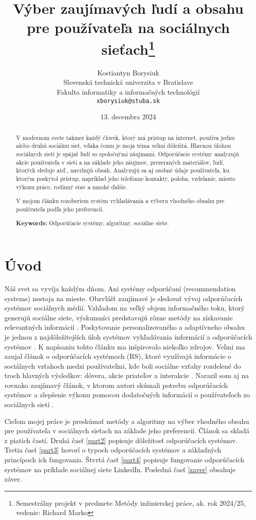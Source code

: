 \documentclass[10pt,twoside,slovak,a4paper]{article}
\title{Výber zaujímavých ľudí a obsahu pre používateľa na sociálnych sieťach\thanks{Semestrálny projekt v predmete Metódy inžinierskej práce, ak. rok 2024/25, vedenie: Richard Marko}} %
\author{Kostiantyn Borysiuk\\[2pt]
	{\small Slovenská technická univerzita v Bratislave}\\
	{\small Fakulta informatiky a informačných technológií}\\
	{\small \texttt{xborysiuk@stuba.sk}}
	}
\date{\small 13. decembra 2024} %
\begin{document}
\maketitle

\begin{abstract}
V modernom svete takmer každý človek, ktorý má prístup na internet, používa jednu alebo druhú sociálnu sieť, vďaka čomu je moja téma veľmi dôležitá. Hlavnou úlohou sociálnych sietí je spájať ľudí so spoločnými záujmami.
Odporúčacie systémy analyzujú akcie používateľa v sieti a na základe jeho záujmov, prezeraných materiálov, ľudí, ktorých sleduje atď., navrhujú obsah. Analyzujú sa aj osobné údaje používateľa, ku ktorým poskytol prístup, napríklad jeho telefónne kontakty, poloha, vzdelanie, miesto výkonu práce, rodinný stav a mnohé ďalšie.

V mojom článku rozoberiem systém vyhľadávania a výberu vhodného obsahu pre používateľa podľa jeho preferencií.

\textbf{Keywords:} Odporúčacie systémy, algoritmy, sociálne siete.

\end{abstract}






\section{Úvod}\label{uvod}
Náš svet sa vyvíja každým dňom. Ani systémy odporúčaní (recommendation systems) nestoja na mieste. Obzvlášť zaujímavé je sledovať vývoj odporúčacích systémov sociálnych médií. Vzhľadom na veľký objem informačného toku, ktorý generujú sociálne siete, výskumníci predstavujú rôzne metódy na získavanie relevantných informácií \cite{diego01}. Poskytovanie personalizovaného a adaptívneho obsahu je jednou z najdôležitejších úloh systémov vyhľadávania informácií a odporúčacích systémov \cite{diego01}. K napísaniu tohto článku ma inšpirovalo niekoľko zdrojov. Veľmi ma zaujal článok o odporúčacích systémoch (RS), ktoré využívajú informácie o sociálnych
vzťahoch medzi používateľmi, kde boli sociálne vzťahy rozdelené do troch hlavných výsledkov: dôvera, akcie priateľov a interakcie \cite{diego01}. Narazil som aj na rovnako zaujímavý článok, v ktorom autori skúmali potrebu odporúčacích systémov a zlepšenie výkonu pomocou dodatočných informácií o používateľoch zo sociálnych sietí \cite{chen02}.


Cieľom mojej práce je preskúmať metódy a algoritmy na výber vhodného obsahu pre používateľa v sociálnych sieťach na základe jeho preferencií. Článok sa skladá z piatich častí. Druhá časť  \ref{part2} popisuje dôležitosť odporúčacích systémov. Tretia časť \ref{part3} hovorí o typoch odporúčacích systémov a základných princípoch ich fungovania. Štvrtá časť \ref{part4} popisuje fungovanie odporúčacích systémov na príklade sociálnej siete LinkedIn. Posledná časť \ref{zaver} obsahuje záver.
\end{document}
